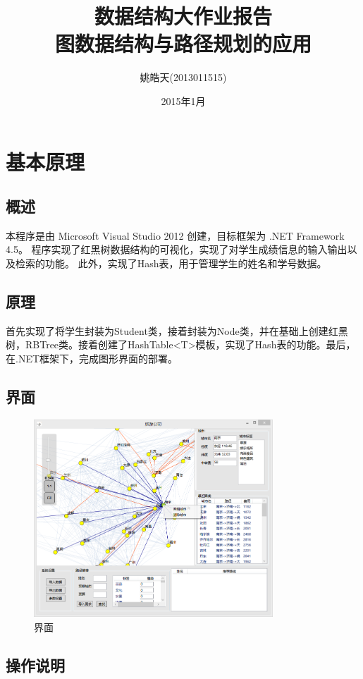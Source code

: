 \documentclass[12pt,a4paper]{article}
\author{姚皓天(2013011515)}
\title{数据结构大作业报告\\图数据结构与路径规划的应用}
\date{2015年1月}
\begin{document}
\maketitle
\thispagestyle{empty}

\newpage
\thispagestyle{empty}
\renewcommand\contentsname{\textbf{目录}}
\tableofcontents

\newpage
\section{基本原理}
\subsection{概述}
本程序是由 Microsoft Visual Studio 2012 创建，目标框架为 .NET Framework 4.5。
程序实现了红黑树数据结构的可视化，实现了对学生成绩信息的输入输出以及检索的功能。
此外，实现了Hash表，用于管理学生的姓名和学号数据。
\subsection{原理}
首先实现了将学生封装为Student类，接着封装为Node类，并在基础上创建红黑树，RBTree类。接着创建了HashTable<T>模板，实现了Hash表的功能。最后，在.NET框架下，完成图形界面的部署。
\subsection{界面}
\begin{figure}[H]
\centering
\includegraphics[width=0.8\textwidth]{2.png}
\caption{界面} 
\end{figure}
\subsection{操作说明}
\end{document}
